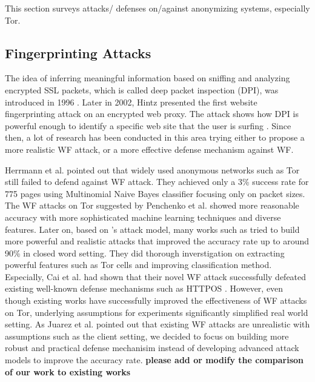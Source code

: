 
This section surveys attacks/ defenses on/against anonymizing systems, especially Tor. 

\subsection{Fingerprinting Attacks}
The idea of inferring meaningful information based on sniffing and analyzing encrypted SSL packets, which is called deep packet inspection (DPI),  was introduced in 1996 \cite{wagner96}. Later in 2002, Hintz presented the first website fingerprinting attack on an encrypted web proxy. The attack shows how DPI is powerful enough to identify a specific web site that the user is surfing \cite{hintz2003}. Since then, a lot of research has been conducted in this area trying either to propose a more realistic WF attack, or a more effective defense mechanism against WF.

Herrmann et al. \cite{herrmann2009} pointed out that widely used anonymous networks such as Tor still failed to defend against WF attack. They achieved only a 3\% success rate for 775 pages using Multinomial Naive Bayes classifier focusing only on packet sizes. The WF attacks on Tor suggested by Penchenko et al. \cite{panchenko11} showed more reasonable accuracy with more sophisticated machine learning techniques and diverse features. Later on, based on \cite{panchenko11}'s attack model, many works such as \cite{wang2013improved, cai2012touching}   tried to build more powerful and realistic attacks that improved the accuracy rate up to around 90\% in closed word setting. They did thorough inverstigation on extracting powerful features such as Tor cells and improving classification method. Especially, Cai et al. \cite{cai2012touching} had shown that their novel WF attack successfully defeated existing well-known defense mechanisms such as HTTPOS \cite{luo2011}. However, even though existing works have successfully improved the effectiveness of WF attacks on Tor, underlying assumptions for experiments significantly simplified real world setting.  As Juarez et al. \cite{juarez14} pointed out that existing WF attacks are unrealistic with assumptions such as the client setting, we decided to focus on building more robust and practical defense mechanisim instead of developing advanced attack models to improve the accuracy rate.
\textbf{please add  or modify the comparison of our work to existing works}


